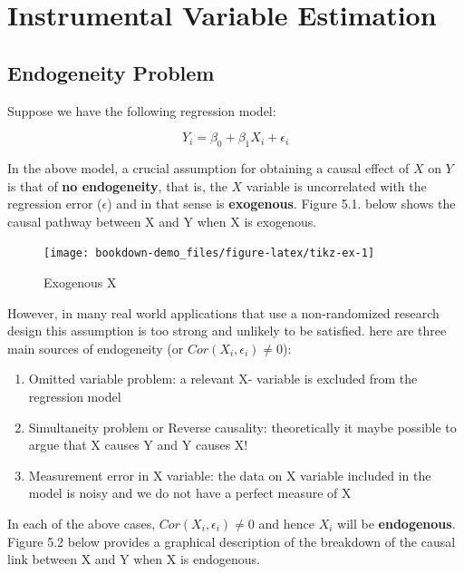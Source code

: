 \documentclass[
]{book}
\theoremstyle{definition}
\theoremstyle{definition}
\theoremstyle{definition}
\theoremstyle{definition}
\theoremstyle{remark}
\begin{document}
\hypertarget{instrumental-variable-estimation}{%
\chapter{Instrumental Variable Estimation}\label{instrumental-variable-estimation}}

\hypertarget{endogeneity-problem}{%
\section{Endogeneity Problem}\label{endogeneity-problem}}

Suppose we have the following regression model:

\[Y_i = \beta_0 + \beta_1  X_i+ \epsilon_i\]

In the above model, a crucial assumption for obtaining a causal effect of \(X\) on \(Y\) is that of \textbf{no endogeneity}, that is, the \(X\) variable is uncorrelated with the regression error (\(\epsilon\)) and in that sense is \textbf{exogenous}. Figure 5.1. below shows the causal pathway between X and Y when X is exogenous.

\begin{figure}

{\centering \texttt{[image: bookdown-demo\_files/figure-latex/tikz-ex-1]} 

}

\caption{Exogenous X}\label{fig:tikz-ex}
\end{figure}

However, in many real world applications that use a non-randomized research design this assumption is too strong and unlikely to be satisfied. here are three main sources of endogeneity (or \(Cor(X_i,\epsilon_i) \neq 0\)):

\begin{enumerate}
\def\labelenumi{\arabic{enumi}.}
\item
  Omitted variable problem: a relevant X- variable is excluded from the regression model
\item
  Simultaneity problem or Reverse causality: theoretically it maybe possible to argue that X causes Y and Y causes X!
\item
  Measurement error in X variable: the data on X variable included in the model is noisy and we do not have a perfect measure of X
\end{enumerate}

In each of the above cases, \(Cor(X_i,\epsilon_i) \neq 0\) and hence \(X_i\) will be \textbf{endogenous}. Figure 5.2 below provides a graphical description of the breakdown of the causal link between X and Y when X is endogenous.
\end{document}
